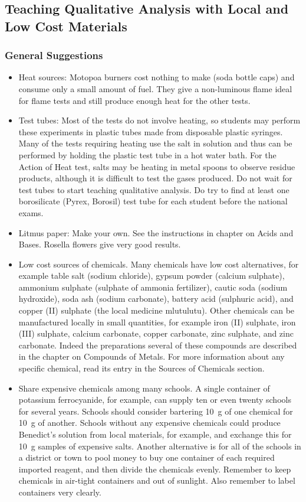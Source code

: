 
\subsection{Teaching Qualitative Analysis with Local and Low Cost Materials}

\subsubsection{General Suggestions}
\begin{itemize}
\item{Heat sources: Motopoa burners cost nothing to make (soda bottle caps) and consume only a small amount of fuel. They give a non-luminous flame ideal for flame tests and still produce enough heat for the other tests.}
\item{Test tubes: Most of the tests do not involve heating, so students may perform these experiments in plastic tubes made from disposable plastic syringes. Many of the tests requiring heating use the salt in solution and thus can be performed by holding the plastic test tube in a hot water bath. For the Action of Heat test, salts may be heating in metal spoons to observe residue products, although it is difficult to test the gases produced. Do not wait for test tubes to start teaching qualitative analysis. Do try to find at least one borosilicate (Pyrex, 
Borosil) test tube for each student before the national exams.}
\item{Litmus paper: Make your own. See the instructions in chapter on Acids and Bases. Rosella flowers give very good results.}
\item{Low cost sources of chemicals. Many chemicals have low cost alternatives, for example table salt (sodium chloride), gypsum powder (calcium sulphate), ammonium sulphate (sulphate of ammonia fertilizer), cautic soda (sodium hydroxide), soda ash (sodium carbonate), battery acid (sulphuric acid), and copper (II) sulphate (the local medicine mlutulutu). Other chemicals can be manufactured locally in small quantities, for example iron (II) sulphate, iron (III) sulphate, calcium carbonate, copper carbonate, zinc sulphate, and zinc carbonate. Indeed the preparations several of these compounds are described in the chapter on Compounds of Metals. For more information about any specific chemical, read its entry in the Sources of Chemicals section.}
\item{Share expensive chemicals among many schools. A single container of potassium ferrocyanide, for example, can supply ten or even twenty schools for several years. Schools should consider bartering 10~g of one chemical for 10~g of another. Schools without any expensive chemicals could produce Benedict's solution from local materials, for example, and exchange this for 10~g samples of expensive salts. Another alternative is for all of the schools in a district or town to pool money to buy one container of each required imported reagent, and then divide the chemicals evenly. Remember to keep chemicals in air-tight containers and out of sunlight. Also remember to label containers very clearly.}
\end{itemize} 


